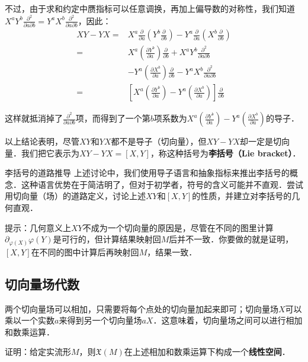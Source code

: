 不过，由于求和约定中赝指标可以任意调换，再加上偏导数的对称性，我们知道$X^aY^b\frac{\partial^2}{\partial a\partial b}=Y^aX^b\frac{\partial^2}{\partial a\partial b}$，因此：
\begin{equation}
\begin{aligned}
XY-YX=&X^a\frac{\partial}{\partial a}(Y^b\frac{\partial}{\partial b})-Y^a\frac{\partial}{\partial a}(X^b\frac{\partial}{\partial b})\\
=&X^a(\frac{\partial Y^b}{\partial a})\frac{\partial}{\partial b}+X^aY^b\frac{\partial^2}{\partial a\partial b}\\&-Y^a(\frac{\partial X^b}{\partial a})\frac{\partial}{\partial b}-Y^aX^b\frac{\partial^2}{\partial a\partial b}\\
=&[X^a(\frac{\partial Y^b}{\partial a})-Y^a(\frac{\partial X^b}{\partial a})]\frac{\partial}{\partial b}
\end{aligned}
\end{equation}

这样就抵消掉了$\frac{\partial^2}{\partial a\partial b}$项，而得到了一个第$b$项系数为$X^a(\frac{\partial Y^b}{\partial a})-Y^a(\frac{\partial X^b}{\partial a})$的导子．

以上结论表明，尽管$XY$和$YX$都不是导子（切向量），但$XY-YX$却一定是切向量．我们把它表示为$XY-YX=[X, Y]$，称这种括号为\textbf{李括号（Lie bracket）}．

\begin{exercise}{李括号的道路推导}\label{Vec_exe1}
上述讨论中，我们使用导子语言和抽象指标来推出李括号的概念．这种语言优势在于简洁明了，但对于初学者，符号的含义可能并不直观．尝试用切向量（场）的道路定义，讨论上述$XY$和$[X, Y]$的性质，并建立对李括号的几何直观．

提示：几何意义上$XY$不成为一个切向量的原因是，尽管在不同的图里计算$\partial_{\varphi(X)}\varphi(Y)$是可行的，但计算结果映射回$M$后并不一致．你要做的就是证明，$[X, Y]$在不同的图中计算后再映射回$M$，结果一致．
\end{exercise}

\subsection{切向量场代数}

两个切向量场可以相加，只需要将每个点处的切向量加起来即可；切向量场$X$可以乘以一个实数$a$来得到另一个切向量场$aX$．这意味着，切向量场之间可以进行相加和数乘运算．

\begin{exercise}{}\label{Vec_exe2}
证明：给定实流形$M$，则$\mathfrak{X}(M)$在上述相加和数乘运算下构成一个\textbf{线性空间}．
\end{exercise}


